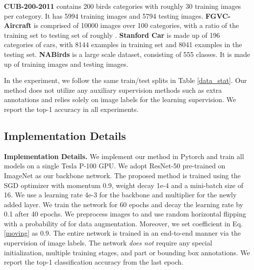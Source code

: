 \documentclass[journal]{IEEEtran}
\begin{document}
\textbf{CUB-200-2011} contains 200 birds categories
with roughly 30 training images per category. It has 5994 training images and 5794 testing images.
\textbf{FGVC-Aircraft} is comprised of 10000 images over 100 categories, with a ratio of the training set to testing set of roughly . 
\textbf{Stanford Car} is made up of 196 categories of cars, with 8144 examples in training set and 8041 examples in the testing set.
\textbf{NABirds} is a large scale dataset, consisting of 555 classes. It is made up of  training images and  testing images.

In the experiment, we follow the same train/test splits in Table \ref{data_stat}. Our method does not utilize any auxiliary supervision methods such as extra annotations and relies solely on image labels for the learning supervision. We report the top-1 accuracy in all experiments.


\subsection{Implementation Details}
\textbf{Implementation Details.}
We implement our method in Pytorch \cite{paszke2017automatic} and train all models on a single Tesla P-100 GPU. We adopt ResNet-50 \cite{he2016deep} pre-trained on ImageNet \cite{deng2009imagenet} as our backbone network.
The proposed method is trained using the SGD optimizer with momentum 0.9, weight decay 1e-4 and a mini-batch size of 16. We use a learning rate 4e-3 for the backbone and  multiplier for the newly added layer. 
We train the network for 60 epochs and decay the learning rate by 0.1 after 40 epochs.
We preprocess images to  and use random horizontal flipping with a probability of  for data augmentation. Moreover, we set coefficient  in Eq. \ref{moving} as 0.9. 
The entire network is trained in an end-to-end manner via the supervision of image labels. The network \emph{does not} require any special initialization, multiple training stages, and part or bounding box annotations. We report the top-1 classification accuracy from the last epoch.
\end{document}
